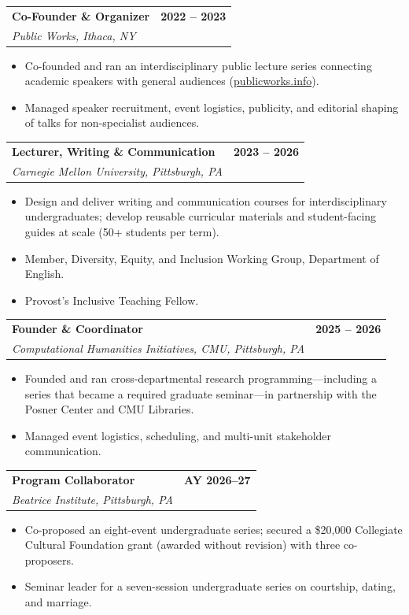 \documentclass[11pt,letterpaper]{article}
\makeatletter
\newcommand{\entry}[4]{%
  \noindent\begin{tabularx}{\linewidth}{@{}X r@{}}
    \textbf{#1} & \textbf{#4}\\
    \textit{#2, #3} & \\
  \end{tabularx}\vspace{1pt}}
\makeatother
\begin{document}
\entry{Co-Founder \& Organizer}{Public Works}{Ithaca, NY}{2022 -- 2023}
\begin{itemize}
  \item Co-founded and ran an interdisciplinary public lecture series connecting academic speakers with general audiences (\href{https://www.publicworks.info}{publicworks.info}).
  \item Managed speaker recruitment, event logistics, publicity, and editorial shaping of talks for non-specialist audiences.
\end{itemize}
\vspace{5pt}

\entry{Lecturer, Writing \& Communication}{Carnegie Mellon University}{Pittsburgh, PA}{2023 -- 2026}
\begin{itemize}
  \item Design and deliver writing and communication courses for interdisciplinary undergraduates; develop reusable curricular materials and student-facing guides at scale (50+ students per term).
  \item Member, Diversity, Equity, and Inclusion Working Group, Department of English.
  \item Provost's Inclusive Teaching Fellow.
\end{itemize}
\vspace{5pt}

\entry{Founder \& Coordinator}{Computational Humanities Initiatives, CMU}{Pittsburgh, PA}{2025 -- 2026}
\begin{itemize}
  \item Founded and ran cross-departmental research programming---including a series that became a required graduate seminar---in partnership with the Posner Center and CMU Libraries.
  \item Managed event logistics, scheduling, and multi-unit stakeholder communication.
\end{itemize}
\vspace{5pt}

\entry{Program Collaborator}{Beatrice Institute}{Pittsburgh, PA}{AY 2026--27}
\begin{itemize}
  \item Co-proposed an eight-event undergraduate series; secured a \$20{,}000 Collegiate Cultural Foundation grant (awarded without revision) with three co-proposers.
  \item Seminar leader for a seven-session undergraduate series on courtship, dating, and marriage.
\end{itemize}
\vspace{5pt}
\end{document}
